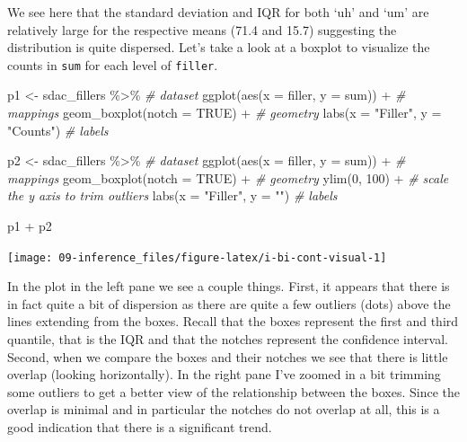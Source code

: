 \documentclass[
]{article}
\newenvironment{Shaded}{\begin{snugshade}}{\end{snugshade}}
\newcommand{\AttributeTok}[1]{\textcolor[rgb]{0.77,0.63,0.00}{#1}}
\newcommand{\CommentTok}[1]{\textcolor[rgb]{0.56,0.35,0.01}{\textit{#1}}}
\newcommand{\ConstantTok}[1]{\textcolor[rgb]{0.00,0.00,0.00}{#1}}
\newcommand{\DecValTok}[1]{\textcolor[rgb]{0.00,0.00,0.81}{#1}}
\newcommand{\FunctionTok}[1]{\textcolor[rgb]{0.00,0.00,0.00}{#1}}
\newcommand{\NormalTok}[1]{#1}
\newcommand{\OtherTok}[1]{\textcolor[rgb]{0.56,0.35,0.01}{#1}}
\newcommand{\SpecialCharTok}[1]{\textcolor[rgb]{0.00,0.00,0.00}{#1}}
\newcommand{\StringTok}[1]{\textcolor[rgb]{0.31,0.60,0.02}{#1}}
\begin{document}
We see here that the standard deviation and IQR for both `uh' and `um' are relatively large for the respective means (71.4 and 15.7) suggesting the distribution is quite dispersed. Let's take a look at a boxplot to visualize the counts in \texttt{sum} for each level of \texttt{filler}.

\begin{Shaded}
\begin{Highlighting}[]
\NormalTok{p1 }\OtherTok{\textless{}{-}} 
\NormalTok{  sdac\_fillers }\SpecialCharTok{\%\textgreater{}\%} \CommentTok{\# dataset}
  \FunctionTok{ggplot}\NormalTok{(}\FunctionTok{aes}\NormalTok{(}\AttributeTok{x =}\NormalTok{ filler, }\AttributeTok{y =}\NormalTok{ sum)) }\SpecialCharTok{+} \CommentTok{\# mappings}
  \FunctionTok{geom\_boxplot}\NormalTok{(}\AttributeTok{notch =} \ConstantTok{TRUE}\NormalTok{) }\SpecialCharTok{+} \CommentTok{\# geometry}
  \FunctionTok{labs}\NormalTok{(}\AttributeTok{x =} \StringTok{"Filler"}\NormalTok{, }\AttributeTok{y =} \StringTok{"Counts"}\NormalTok{) }\CommentTok{\# labels}

\NormalTok{p2 }\OtherTok{\textless{}{-}} 
\NormalTok{  sdac\_fillers }\SpecialCharTok{\%\textgreater{}\%} \CommentTok{\# dataset}
  \FunctionTok{ggplot}\NormalTok{(}\FunctionTok{aes}\NormalTok{(}\AttributeTok{x =}\NormalTok{ filler, }\AttributeTok{y =}\NormalTok{ sum)) }\SpecialCharTok{+} \CommentTok{\# mappings}
  \FunctionTok{geom\_boxplot}\NormalTok{(}\AttributeTok{notch =} \ConstantTok{TRUE}\NormalTok{) }\SpecialCharTok{+} \CommentTok{\# geometry}
  \FunctionTok{ylim}\NormalTok{(}\DecValTok{0}\NormalTok{, }\DecValTok{100}\NormalTok{) }\SpecialCharTok{+} \CommentTok{\# scale the y axis to trim outliers}
  \FunctionTok{labs}\NormalTok{(}\AttributeTok{x =} \StringTok{"Filler"}\NormalTok{, }\AttributeTok{y =} \StringTok{""}\NormalTok{) }\CommentTok{\# labels}

\NormalTok{p1 }\SpecialCharTok{+}\NormalTok{ p2}
\end{Highlighting}
\end{Shaded}

\begin{center}\texttt{[image: 09-inference\_files/figure-latex/i-bi-cont-visual-1]} \end{center}

In the plot in the left pane we see a couple things. First, it appears that there is in fact quite a bit of dispersion as there are quite a few outliers (dots) above the lines extending from the boxes. Recall that the boxes represent the first and third quantile, that is the IQR and that the notches represent the confidence interval. Second, when we compare the boxes and their notches we see that there is little overlap (looking horizontally). In the right pane I've zoomed in a bit trimming some outliers to get a better view of the relationship between the boxes. Since the overlap is minimal and in particular the notches do not overlap at all, this is a good indication that there is a significant trend.
\end{document}

